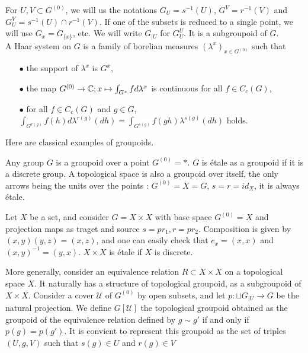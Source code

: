 For $U,V\subset G^{(0)}$, we will us the notations $G_U=s^{-1}(U)$, $G^V=r^{-1}(V)$ and $G_U^V=s^{-1}(U)\cap r^{-1}(V)$. If one of the subsets is reduced to a single point, we will use $G_x=G_{\{x\}}$, etc. We will write $G_{|U}$ for $G_U^U$. It is a subgroupoid of $G$.\\

A Haar system on $G$ is a family of borelian measures $(\lambda^x)_{x\in G^{(0)}}$ such that 
\begin{itemize}
\item[$\bullet$] the support of $\lambda^x$ is $G^x$, 
\item[$\bullet$] the map $G^{(0)} \rightarrow \mathbb C; x\mapsto \int_{G^x} f d\lambda^x$ is continuous for all $f\in C_c(G)$,
\item[$\bullet$] for all $f\in C_c(G)$ and $g\in G$, $\int_{G^{r(g)}} f(h) d\lambda^{r(g)}(dh)= \int_{G^{s(g)}} f(gh) \lambda^{s(g)}(dh)$ holds.
\end{itemize}

Here are classical examples of groupoids.\\

\begin{Expl} Any group $G$ is a groupoid over a point $G^{(0)}=*$. $G$ is étale as a groupoid if it is a discrete group. A topological space is also a groupoid over itself, the only arrows being the units over the points : $G^{(0)} = X = G$, $s=r=id_X$, it is always étale.
\end{Expl}

\begin{Expl} Let $X$ be a set, and consider $G=X\times X$ with base space $G^{(0)}=X$ and projection maps as traget and source $s=pr_1, r=pr_2$. Composition is given by $(x,y)(y,z)= (x,z)$, and one can easily check that $e_x=(x,x)$ and $(x,y)^{-1} = (y,x)$. $X\times X$ is étale if $X$ is discrete.
\end{Expl}

\begin{Expl} More generally, consider an equivalence relation $R \subset X\times X$ on a topological space $X$. It naturally has a structure of topological groupoid, as a subgroupoid of $X\times X$. Consider a cover $\mathcal U$ of $G^{(0)}$ by open subsets, and let $p : \sqcup G_{|U} \rightarrow G$ be the natural projection. We define $G[\mathcal U]$ the topological groupoid obtained as the groupoid of the equivalence relation defined by $g\sim g'$ if and only if $p(g)=p(g')$. It is convient to represent this groupoid as the set of triples $(U,g,V)$ such that $s(g)\in U$ and $r(g)\in V$
\end{Expl}

